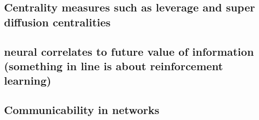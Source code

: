 \documentclass[10pt,a4paper]{article}
\begin{document}
\subsection{Centrality measures such as leverage and super diffusion centralities}
\subsection{neural correlates to future value of information (something in line is about reinforcement learning)}
\subsection{Communicability in networks}

\newpage

\end{document}
